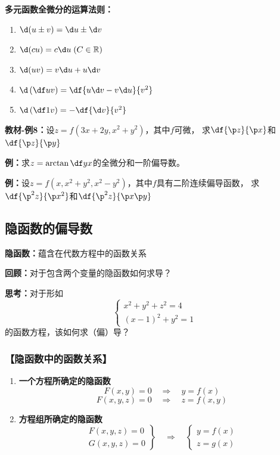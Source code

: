 {\bf 多元函数全微分的运算法则：}
\begin{enumerate}[(1)]
  \setlength{\itemindent}{1cm}
  \item $\d(u\pm v)=\d u\pm \d v$
  \item $\d(cu)=c\d u\;(C\in\mathbb{R})$
  \item $\d(uv)=v\d u+u\d v$
  \item $\d\left(\df uv\right)=\df{u\d v-v\d u}{v^2}$
  \item $\d\left(\df 1v\right)=-\df{\d v}{v^2}$
\end{enumerate}

{\bf 教材-例8：}设$z=f(3x+2y,x^2+y^2)$，其中$f$可微，
求$\df{\p z}{\p x}$和$\df{\p z}{\p y}$

{\bf 例：}求$z=\arctan\df yx$的全微分和一阶偏导数。

{\bf 例：}设$z=f(x,x^2+y^2,x^2-y^2)$，其中$f$具有二阶连续偏导函数，
求$\df{\p^2 z}{\p x^2}$和$\df{\p^2 z}{\p x\p y}$

\subsection{隐函数的偏导数}

{\bf 隐函数：}蕴含在代数方程中的函数关系

{\bf 回顾：}对于包含两个变量的隐函数如何求导？

{\bf 思考：}对于形如
$$\left\{\begin{array}{l}
	  	x^2+y^2+z^2=4\\
	  	(x-1)^2+y^2=1
	  \end{array}\right.$$
的函数方程，该如何求（偏）导？

\subsubsection{【隐函数中的函数关系】}

\begin{enumerate}
  \setlength{\itemindent}{1cm}
  \item {\bf 一个方程所确定的隐函数} 
  $$F(x,y)=0 \quad \Rightarrow \quad y=f(x) $$
  $$F(x,y,z)=0 \quad \Rightarrow \quad z=f(x,y) $$
  \item {\bf 方程组所确定的隐函数} 
  $$\left.\begin{array}{l}
  	F(x,y,z)=0\\ G(x,y,z)=0
  \end{array}\right\} \quad \Rightarrow \quad 
  \left\{\begin{array}{l}
  	y=f(x)\\ z=g(x)
  \end{array}\right. $$
\end{enumerate}

